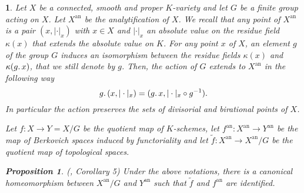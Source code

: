 \documentclass{amsart}%
\numberwithin{equation}{subsection}
\theoremstyle{plain2}
\newtheorem{prop}[equation]{Proposition}
\theoremstyle{definition2}
\theoremstyle{stepstyle}
\theoremstyle{point}
\theoremstyle{subpoint}
\newtheorem{subpoint}[equation]{}%
\newcommand{\spa}[1]{\begin{subpoint}#1\end{subpoint}}           %
\newcommand{\an}{\mathrm{an}}
\begin{document}
\spa{Let $X$ be a connected, smooth  and proper $K$-variety and let $G$ be a finite group acting on $X$. Let $X^{\an}$ be the analytification of $X$. We recall that any point of $X^{\an}$ is a pair $(x,|\cdot|_x)$ with $x \in X$ and $|\cdot|_x$ an absolute value on the residue field $\kappa(x)$ that extends the absolute value on $K$. For any point $x$ of $X$, an element $g$ of the group $G$ induces an isomorphism between the residue fields $\kappa(x)$ and $\kappa(g \ldotp x)$, that we still denote by $g$. Then, the action of $G$ extends to $X^\an$ in the following way $$g \ldotp (x,|\cdot|_x) = ( g \ldotp x,  |\cdot|_x \circ g^{-1}).$$ In particular the action preserves the sets of divisorial and birational points of $X$.

Let $f: X \rightarrow Y=X/G$ be the quotient map of $K$-schemes, let $f^\an: X^\an \rightarrow Y^\an$ be the map of Berkovich spaces induced by functoriality and let $\tilde{f}: X^\an \rightarrow X^\an/G$ be the quotient map of topological spaces.
\begin{prop} (\cite{Berkovich}, Corollary 5) \label{prop Berk identification of quotient}
Under the above notations, there is a canonical homeomorphism between $X^\an/G $ and $Y^\an$ such that $\tilde{f}$ and $f^\an$ are identified.
\end{prop}
}
\end{document}
